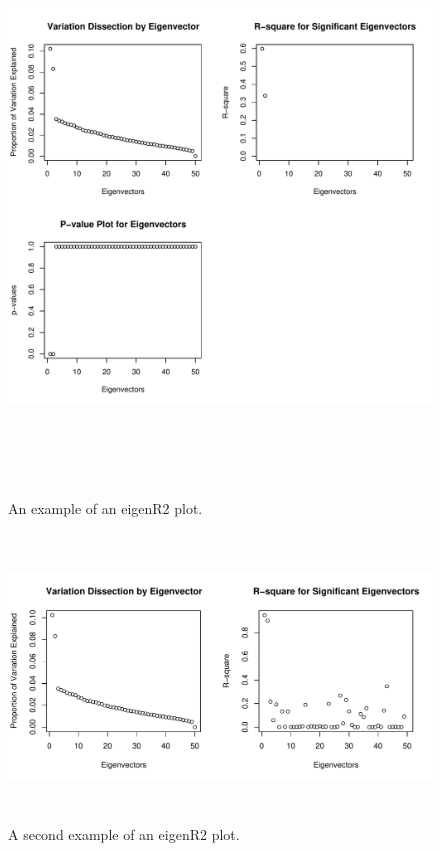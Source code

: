 \documentclass[11pt]{article}
\begin{document}
 

\newpage
\begin{figure}[ht]
  \begin{center}
    \includegraphics[width=6in,height=6in]{ageadj2}
  \end{center}
  \caption{An example of an eigenR2 plot.}
\end{figure}
\begin{figure}[ht]
  \begin{center}
    \includegraphics[width=6in,height=3in]{ag}
  \end{center}
  \caption{A second example of an eigenR2 plot.}
\end{figure}
\end{document}
